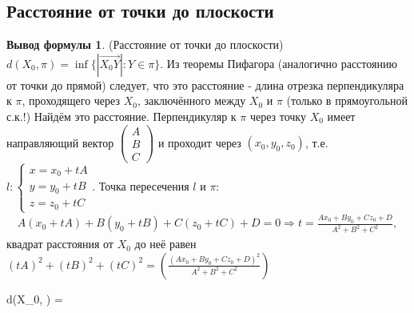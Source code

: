 \documentclass[a4paper, 12pt]{article}
\theoremstyle{definition}
\newtheorem*{formula}{Вывод формулы}
\newenvironment{boxedalign*}
  {\begin{equation*}\begin{lrbox}{\boxedalignbox}$\begin{aligned}}
  {\end{aligned}$\end{lrbox}\fbox{\usebox{\boxedalignbox}}\end{equation*}}
\begin{document}
	\subsection{Расстояние от точки до плоскости}
	\begin{formula}(Расстояние от точки до плоскости)\\
		$d(X_0, \pi) = \inf\{|\overrightarrow{X_0Y}|:Y\in\pi\}$. Из теоремы Пифагора (аналогично расстоянию от точки до прямой) следует, что это расстояние - длина отрезка перпендикуляра к $\pi$, проходящего через $X_0$, заключённого между $X_0$ и $\pi$ (только в прямоугольной с.к.!)
		Найдём это расстояние. Перпендикуляр к $\pi$ через точку $X_0$ имеет направляющий вектор $\begin{pmatrix} A  \\ B \\ C \end{pmatrix}$ и проходит через $(x_0, y_0, z_0)$, т.е. $l:\begin{cases}x = x_{0} + tA \\ y = y_{0} + tB \\ z = z_0 + tC\end{cases}$.
		Точка пересечения $l$ и $\pi$: \begin{align*}
			A(x_0+tA) + B(y_0+tB) + C(z_0+tC) + D = 0 \Rightarrow t = \frac{Ax_0 + By_0 + Cz_0 + D}{A^2 + B^2 + C^2},
		\end{align*}
		квадрат расстояния от $X_0$ до неё равен $(tA)^2 + (tB)^2 +(tC)^2 = (\frac{(Ax_0 + By_0 + Cz_0 + D)^2}{A^2 + B^2 + C^2})$\begin{boxedalign*}
			\Rightarrow d(X_0, \pi) = 
		\end{boxedalign*}
	\end{formula}
\end{document}
